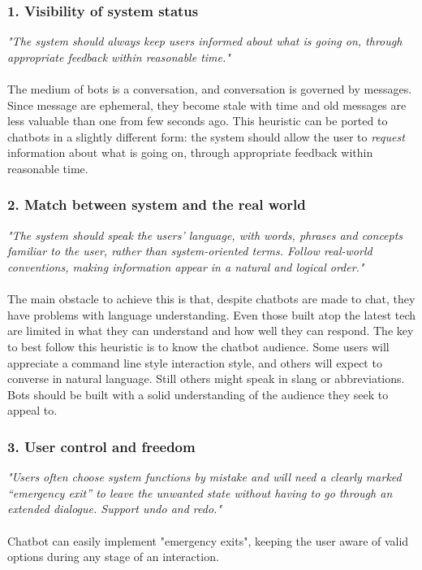 \documentclass[b5paper,10pt,twoside,cucitura]{toptesi}
\begin{document}
\subsubsection{1. Visibility of system status}
\textit{"The system should always keep users informed about what is going on, through appropriate feedback within reasonable time."}
\\
\\
The medium of bots is a conversation, and conversation is governed by messages. Since message are ephemeral, they become stale with time and old messages are less valuable than one from few seconds ago. This heuristic can be ported to chatbots in a slightly different form: the system should allow the user to \textit{request} information about what is going on, through appropriate feedback within reasonable time.

\subsubsection{2. Match between system and the real world}
\textit{"The system should speak the users’ language, with words, phrases and concepts familiar to the user, rather than system-oriented terms. Follow real-world conventions, making information appear in a natural and logical order."}
\\
\\
The main obstacle to achieve this is that, despite chatbots are made to chat, they have problems with language understanding. Even those built atop the latest tech are limited in what they can understand and how well they can respond. The key to best follow this heuristic is to know the chatbot audience. Some users will appreciate a command line style interaction style, and others will expect to converse in natural language. Still others might speak in slang or abbreviations. Bots should be built with a solid understanding of the audience they seek to appeal to.

\subsubsection{3. User control and freedom}
\textit{"Users often choose system functions by mistake and will need a clearly marked “emergency exit” to leave the unwanted state without having to go through an extended dialogue. Support undo and redo."}
\\
\\
Chatbot can easily implement "emergency exits", keeping the user aware of valid options during any stage of an interaction.
\end{document}
